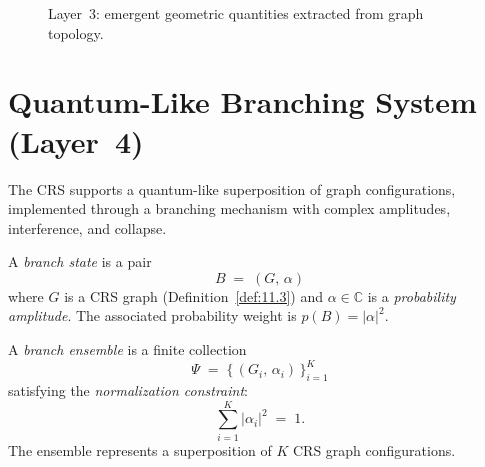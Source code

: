 \begin{figure}[t]
\centering
{}
\caption{Layer~3: emergent geometric quantities extracted from
  graph topology.}
\label{fig:c11:spacetime}
\end{figure}

\section{Quantum-Like Branching System (Layer~4)}
\label{sec:ch11:branching}

The CRS supports a quantum-like superposition of graph configurations,
implemented through a branching mechanism with complex amplitudes,
interference, and collapse.

\begin{definition}
\label{def:11.21}
A \emph{branch state} is a pair
\[
  B \;=\; (G,\, \alpha)
\]
where $G$ is a CRS graph (Definition~\ref{def:11.3}) and
$\alpha \in \mathbb{C}$ is a \emph{probability amplitude}.  The
associated probability weight is $p(B) = |\alpha|^2$.
\end{definition}

\begin{definition}
\label{def:11.22}
A \emph{branch ensemble} is a finite collection
\begin{equation}
\label{eq:11.ensemble}
  \Psi \;=\;
  \bigl\{\, (G_i,\, \alpha_i) \,\bigr\}_{i=1}^{K}
\end{equation}
satisfying the \emph{normalization constraint}:
\begin{equation}
\label{eq:11.normalization}
  \sum_{i=1}^{K} |\alpha_i|^2 \;=\; 1.
\end{equation}
The ensemble represents a superposition of $K$ CRS graph
configurations.
\end{definition}

